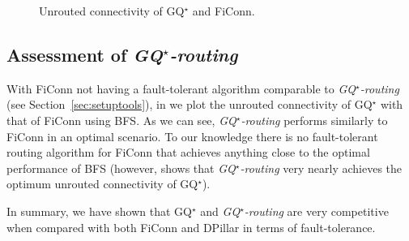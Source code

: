 \documentclass[]{amsart}
\begin{document}
{\begin{figure}[ht]
{}
\caption{Unrouted connectivity of GQ$^\star$ and FiConn.}
\label{plot:swnet-ficonn-unrouted-connectivity}
\end{figure}

\subsection{Assessment of \emph{GQ$^\star$-routing\/}}
\label{sec:evaluate-gqsrouting}


With FiConn not having a fault-tolerant algorithm comparable to
\emph{GQ$^\star$-routing\/} (see Section~\ref{sec:setuptools}), in
 we plot the
unrouted connectivity of GQ$^\star$ with that of FiConn using BFS. As we can see, \emph{GQ$^\star$-routing\/} performs similarly to FiConn in an optimal scenario.  To our knowledge
there is no fault-tolerant routing algorithm for FiConn that
achieves anything close to the optimal performance of BFS (however,
 shows that
\emph{GQ$^\star$-routing\/} very nearly achieves the optimum unrouted
connectivity of GQ$^\star$).

In summary, we have shown that GQ$^\star$ and \emph{GQ$^\star$-routing\/} are very competitive when compared with both FiConn and DPillar in terms of fault-tolerance.

\begin{figure}[ht]
{\centering


}
\end{figure}}
\end{document}
